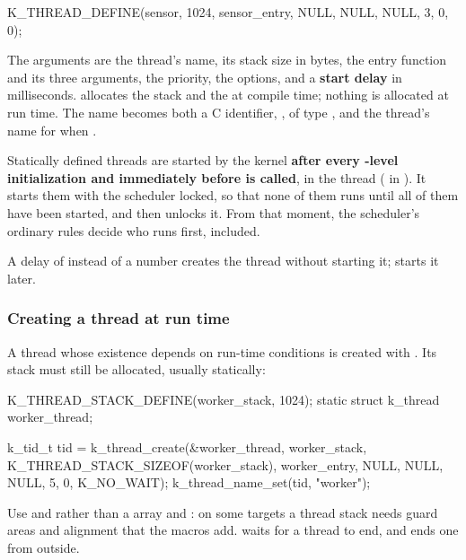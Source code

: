 \begin{ccode}
K_THREAD_DEFINE(sensor, 1024, sensor_entry, NULL, NULL, NULL, 3, 0, 0);
\end{ccode}

\noindent The arguments are the thread’s name, its stack size in bytes, the entry function and its
three arguments, the priority, the options, and a \textbf{start delay} in milliseconds.
 allocates the stack and the  at compile time; nothing
is allocated at run time. The name becomes both a C identifier, , of type
, and the thread’s name for  when
.

Statically defined threads are started by the kernel \textbf{after every -level
initialization and immediately before  is called}, in the  thread
( in ). It starts them with the
scheduler locked, so that none of them runs until all of them have been started, and then unlocks
it. From that moment, the scheduler’s ordinary rules decide who runs first,  included.

A delay of  instead of a number creates the thread without starting it;
 starts it later.

\subsubsection{Creating a thread at run time}
A thread whose existence depends on run-time conditions is created with .
Its stack must still be allocated, usually statically:

\begin{ccode}
K_THREAD_STACK_DEFINE(worker_stack, 1024);
static struct k_thread worker_thread;

k_tid_t tid = k_thread_create(&worker_thread, worker_stack, K_THREAD_STACK_SIZEOF(worker_stack),
                              worker_entry, NULL, NULL, NULL, 5, 0, K_NO_WAIT);
k_thread_name_set(tid, "worker");
\end{ccode}

\noindent Use  and  rather than a
 array and : on some targets a thread stack needs guard areas and alignment
that the macros add.  waits for a thread to end, and 
ends one from outside.

